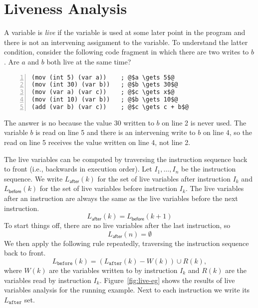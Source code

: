 \documentclass[12pt]{book}
\begin{document}
\section{Liveness Analysis}

A variable is \emph{live} if the variable is used at some later point
in the program and there is not an intervening assignment to the
variable.
%
To understand the latter condition, consider the following code
fragment in which there are two writes to $b$. Are $a$ and
$b$ both live at the same time? 
\begin{lstlisting}[numbers=left,numberstyle=\tiny]
(mov (int 5) (var a))    ; @$a \gets 5$@
(mov (int 30) (var b))   ; @$b \gets 30$@
(mov (var a) (var c))    ; @$c \gets x$@
(mov (int 10) (var b))   ; @$b \gets 10$@
(add (var b) (var c))    ; @$c \gets c + b$@
\end{lstlisting}
The answer is no because the value $30$ written to $b$ on line 2 is
never used. The variable $b$ is read on line 5 and there is an
intervening write to $b$ on line 4, so the read on line 5 receives the
value written on line 4, not line 2.

The live variables can be computed by traversing the instruction
sequence back to front (i.e., backwards in execution order).  Let
$I_1,\ldots, I_n$ be the instruction sequence. We write
$L_{\mathsf{after}}(k)$ for the set of live variables after
instruction $I_k$ and $L_{\mathsf{before}}(k)$ for the set of live
variables before instruction $I_k$. The live variables after an
instruction are always the same as the live variables before the next
instruction.
\begin{equation*}
  L_{\mathsf{after}}(k) = L_{\mathsf{before}}(k+1)
\end{equation*}
To start things off, there are no live variables after the last
instruction, so 
\begin{equation*}
  L_{\mathsf{after}}(n) = \emptyset 
\end{equation*}
We then apply the following rule repeatedly, traversing the
instruction sequence back to front.
\begin{equation*}
  L_{\mathtt{before}}(k) = (L_{\mathtt{after}}(k) - W(k)) \cup R(k),
\end{equation*}
where $W(k)$ are the variables written to by instruction $I_k$ and
$R(k)$ are the variables read by instruction $I_k$.
Figure~\ref{fig:live-eg} shows the results of live variables analysis
for the running example. Next to each instruction we write its
$L_{\mathtt{after}}$ set.
\end{document}
